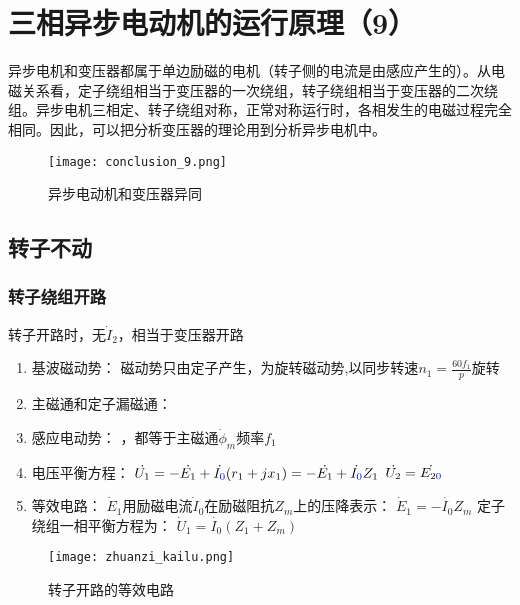 \documentclass[blue]{elegantnote}
\author{}
\begin{document}
\maketitle
\tableofcontents
\chapter{三相异步电动机的运行原理（9）}
异步电机和变压器都属于单边励磁的电机（转子侧的电流是由感应产生的）。从电磁关系看，定子绕组相当于变压器的一次绕组，转子绕组相当于变压器的二次绕组。异步电机三相定、转子绕组对称，正常对称运行时，各相发生的电磁过程完全相同。因此，可以把分析变压器的理论用到分析异步电机中。

\begin{figure}[!hbtp]
	\centering
	\texttt{[image: conclusion\_9.png]}
	\caption{异步电动机和变压器异同}
\end{figure}

\newpage
\section{转子不动}

\subsection{转子绕组开路}
{\color{thid}转子开路时，无$\dot I_2$，相当于变压器开路}
\begin{enumerate}
	\item 基波磁动势：
	\newline 磁动势{\color{blue}只由定子产生}，为旋转磁动势,{\color{blue}以同步转速$n_1=\frac{60f_1}{p}$旋转}
	\item 主磁通和定子漏磁通：
	\item 感应电动势：
	，都等于主磁通$\dot\phi_m$频率{\color{blue}$f_1$}
	\item 电压平衡方程：
	\newline$\dot{U_1}=-\dot{E_1}+\dot{I_{\color{blue}0}}(r_1+jx_1)=-\dot{E_1}+\dot{I_{\color{blue}0}}Z_1$
	\newline $\dot{U_2}=\dot{E_{2{\color{blue}0}}}$
	\item 等效电路：
	\newline $\dot E_1$用励磁电流$\dot I_0$在励磁阻抗$Z_m$上的压降表示： $\dot E_1=-\dot{I_0}Z_m$
	\newline 定子绕组一相平衡方程为： $\dot U_1=\dot{I_0}(Z_1+Z_m)$
\end{enumerate}
\begin{figure}[!hbtp]
	\centering
	\texttt{[image: zhuanzi\_kailu.png]}
	\caption{转子开路的等效电路\label{figur:zhuanzi_kailu}}
\end{figure}
\end{document}
